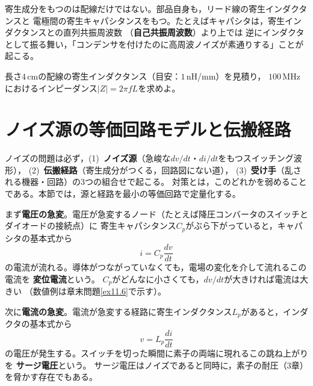 \begin{注意}
寄生成分をもつのは配線だけではない。部品自身も，リード線の寄生インダクタンスと
電極間の寄生キャパシタンスをもつ。たとえばキャパシタは，寄生インダクタンスとの直列共振周波数
（\textbf{自己共振周波数}）より上では
逆にインダクタとして振る舞い，「コンデンサを付けたのに高周波ノイズが素通りする」ことが起こる。
\end{注意}

\begin{問}
\item 長さ$4$\,cmの配線の寄生インダクタンス（目安：$1$\,nH/mm）を見積り，
$100$\,MHzにおけるインピーダンス$|Z| = 2\pi f L$を求めよ。
\end{問}


\section{ノイズ源の等価回路モデルと伝搬経路}
\label{sec11.5}

ノイズの問題は必ず，(1)~\textbf{ノイズ源}（急峻な$dv/dt$・$di/dt$をもつスイッチング波形），
(2)~\textbf{伝搬経路}（寄生成分がつくる，回路図にない道），
(3)~\textbf{受け手}（乱される機器・回路）の3つの組合せで起こる。
対策とは，このどれかを弱めることである。本節では，源と経路を最小の等価回路で定量化する。

まず\textbf{電圧の急変}。電圧が急変するノード（たとえば降圧コンバータのスイッチとダイオードの接続点）に
寄生キャパシタンス$C_p$がぶら下がっていると，キャパシタの基本式から
\begin{equation}
i = C_p \frac{dv}{dt}
\label{eq11.10}
\end{equation}
の電流が流れる。導体がつながっていなくても，電場の変化を介して流れるこの電流を
\textbf{変位電流}という。
$C_p$がどんなに小さくても，$dv/dt$が大きければ電流は大きい
（数値例は章末問題\ref{ex11.6}で示す）。

次に\textbf{電流の急変}。電流が急変する経路に寄生インダクタンス$L_p$があると，インダクタの基本式から
\begin{equation}
v = L_p \frac{di}{dt}
\label{eq11.11}
\end{equation}
の電圧が発生する。スイッチを切った瞬間に素子の両端に現れるこの跳ね上がりを
\textbf{サージ電圧}という。
サージ電圧はノイズであると同時に，素子の耐圧（3章）を脅かす存在でもある。

